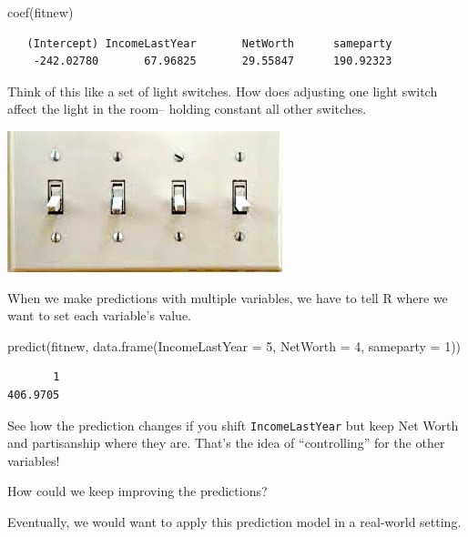 \documentclass[
  letterpaper,
  DIV=11,
  numbers=noendperiod]{scrreprt}
\newenvironment{Shaded}{\begin{snugshade}}{\end{snugshade}}
\newcommand{\AttributeTok}[1]{\textcolor[rgb]{0.40,0.45,0.13}{#1}}
\newcommand{\DecValTok}[1]{\textcolor[rgb]{0.68,0.00,0.00}{#1}}
\newcommand{\FunctionTok}[1]{\textcolor[rgb]{0.28,0.35,0.67}{#1}}
\newcommand{\NormalTok}[1]{\textcolor[rgb]{0.00,0.23,0.31}{#1}}
\begin{document}
\begin{Shaded}
\begin{Highlighting}[]
\FunctionTok{coef}\NormalTok{(fitnew)}
\end{Highlighting}
\end{Shaded}

\begin{verbatim}
   (Intercept) IncomeLastYear       NetWorth      sameparty 
    -242.02780       67.96825       29.55847      190.92323 
\end{verbatim}

Think of this like a set of light switches. How does adjusting one light
switch affect the light in the room-- holding constant all other
switches.

\includegraphics[width=0.6\textwidth,height=\textheight]{images/lightswitch.jpeg}

When we make predictions with multiple variables, we have to tell R
where we want to set each variable's value.

\begin{Shaded}
\begin{Highlighting}[]
\FunctionTok{predict}\NormalTok{(fitnew, }\FunctionTok{data.frame}\NormalTok{(}\AttributeTok{IncomeLastYear =} \DecValTok{5}\NormalTok{, }\AttributeTok{NetWorth =} \DecValTok{4}\NormalTok{, }\AttributeTok{sameparty =} \DecValTok{1}\NormalTok{))}
\end{Highlighting}
\end{Shaded}

\begin{verbatim}
       1 
406.9705 
\end{verbatim}

See how the prediction changes if you shift \texttt{IncomeLastYear} but
keep Net Worth and partisanship where they are. That's the idea of
``controlling'' for the other variables!

How could we keep improving the predictions?

Eventually, we would want to apply this prediction model in a real-world
setting.
\end{document}
